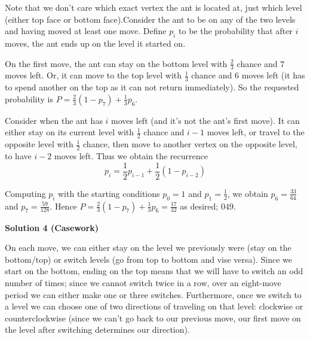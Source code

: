 \begin{enumerate}
Note that we don't care which exact vertex the ant is located at, just which level (either top face or bottom face).Consider the ant to be on any of the two levels and having moved at least one move. Define $p_i$ to be the probability that after $i$ moves, the ant ends up on the level it started on.

 On the first move, the ant can stay on the bottom level with $\frac{2}{3}$ chance and $7$ moves left. Or, it can move to the top level with $\frac{1}{3}$ chance and $6$ moves left (it has to spend another on the top as it can not return immediately). So the requested probability is $P = \frac{2}{3}(1 - p_7) + \frac{1}{3}p_6$. 

 Consider when the ant has $i$ moves left (and it's not the ant's first move). It can either stay on its current level with $\frac{1}{2}$ chance and $i - 1$ moves left, or travel to the opposite level with $\frac{1}{2}$ chance, then move to another vertex on the opposite level, to have $i - 2$ moves left. Thus we obtain the recurrence
 \[p_i = \frac{1}{2}p_{i - 1} + \frac{1}{2}(1 - p_{i - 2})\]

 Computing $p_i$ with the starting conditions $p_0 = 1$ and $p_1 = \frac{1}{2}$, we obtain $p_6 = \frac{33}{64}$ and $p_7 = \frac{59}{128}$. Hence $P = \frac{2}{3}(1 - p_7) + \frac{1}{3}p_6= \frac{17}{32}$ as desired; $\boxed{049}$.

 



\textbf{Solution 4 (Casework)}

On each move, we can either stay on the level we previously were (stay on the bottom/top) or switch levels (go from top to bottom and vise versa). Since we start on the bottom, ending on the top means that we will have to switch an odd number of times; since we cannot switch twice in a row, over an eight-move period we can either make one or three switches. Furthermore, once we switch to a level we can choose one of two directions of traveling on that level: clockwise or counterclockwise (since we can't go back to our previous move, our first move on the level after switching determines our direction). 


\end{enumerate}
